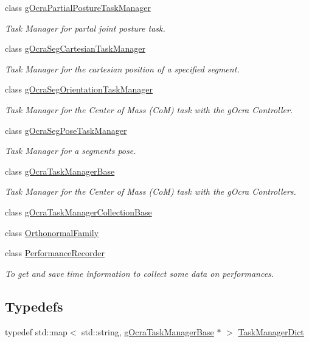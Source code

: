 \begin{DoxyCompactItemize}
class \hyperlink{classgocra_1_1gOcraPartialPostureTaskManager}{g\+Ocra\+Partial\+Posture\+Task\+Manager}
\begin{DoxyCompactList}\small\item\em Task Manager for partal joint posture task. \end{DoxyCompactList}\item 
class \hyperlink{classgocra_1_1gOcraSegCartesianTaskManager}{g\+Ocra\+Seg\+Cartesian\+Task\+Manager}
\begin{DoxyCompactList}\small\item\em Task Manager for the cartesian position of a specified segment. \end{DoxyCompactList}\item 
class \hyperlink{classgocra_1_1gOcraSegOrientationTaskManager}{g\+Ocra\+Seg\+Orientation\+Task\+Manager}
\begin{DoxyCompactList}\small\item\em Task Manager for the Center of Mass (CoM) task with the g\+Ocra Controller. \end{DoxyCompactList}\item 
class \hyperlink{classgocra_1_1gOcraSegPoseTaskManager}{g\+Ocra\+Seg\+Pose\+Task\+Manager}
\begin{DoxyCompactList}\small\item\em Task Manager for a segment\textquotesingle{}s pose. \end{DoxyCompactList}\item 
class \hyperlink{classgocra_1_1gOcraTaskManagerBase}{g\+Ocra\+Task\+Manager\+Base}
\begin{DoxyCompactList}\small\item\em Task Manager for the Center of Mass (CoM) task with the g\+Ocra Controllers. \end{DoxyCompactList}\item 
class \hyperlink{classgocra_1_1gOcraTaskManagerCollectionBase}{g\+Ocra\+Task\+Manager\+Collection\+Base}
\item 
class \hyperlink{classgocra_1_1OrthonormalFamily}{Orthonormal\+Family}
\item 
class \hyperlink{classgocra_1_1PerformanceRecorder}{Performance\+Recorder}
\begin{DoxyCompactList}\small\item\em To get and save time information to collect some data on performances. \end{DoxyCompactList}\end{DoxyCompactItemize}
\subsection*{Typedefs}
\begin{DoxyCompactItemize}
\item 
typedef std\+::map$<$ std\+::string, \hyperlink{classgocra_1_1gOcraTaskManagerBase}{g\+Ocra\+Task\+Manager\+Base} $\ast$ $>$ \hyperlink{namespacegocra_ad407175473be2e361f2937acf73ca06c}{Task\+Manager\+Dict}
\end{DoxyCompactItemize}


